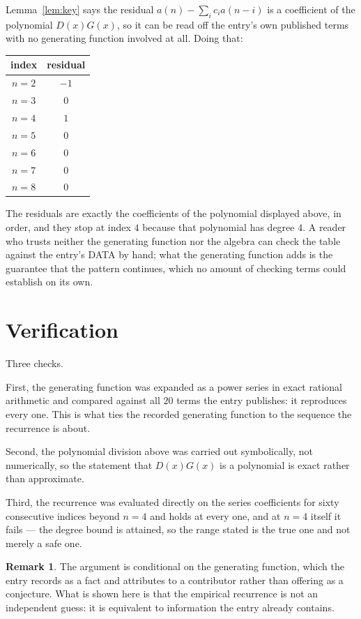 \documentclass[11pt,a4paper]{article}
\theoremstyle{plain}
\theoremstyle{definition}
\newtheorem{remark}[theorem]{Remark}
\begin{document}
Lemma~\ref{lem:key} says the residual $a(n)-\sum_ic_ia(n-i)$ is a coefficient of the
polynomial $D(x)G(x)$, so it can be read off the entry's own published terms with no
generating function involved at all. Doing that:
\begin{center}
\begin{tabular}{cc}
index & residual \\ \hline
$n=2$ & $-1$ \\
$n=3$ & $0$ \\
$n=4$ & $1$ \\
$n=5$ & $0$ \\
$n=6$ & $0$ \\
$n=7$ & $0$ \\
$n=8$ & $0$
\end{tabular}
\end{center}
The residuals are exactly the coefficients of the polynomial displayed above, in order, and
they stop at index $4$ because that polynomial has degree $4$. A reader who trusts
neither the generating function nor the algebra can check the table against the entry's DATA
by hand; what the generating function adds is the guarantee that the pattern continues, which
no amount of checking terms could establish on its own.

\section{Verification}

Three checks.

First, the generating function was expanded as a power series in exact rational arithmetic and
compared against all $20$ terms the entry publishes: it reproduces every one. This is
what ties the recorded generating function to the sequence the recurrence is about.

Second, the polynomial division above was carried out symbolically, not numerically, so the
statement that $D(x)G(x)$ is a polynomial is exact rather than approximate.

Third, the recurrence was evaluated directly on the series coefficients for sixty consecutive
indices beyond $n=4$ and holds at every one, and at $n=4$ itself it fails --- the
degree bound is attained, so the range stated is the true one and not merely a safe one.

\begin{remark}
The argument is conditional on the generating function, which the entry records as a fact and
attributes to a contributor rather than offering as a conjecture. What is shown here is that
the empirical recurrence is not an independent guess: it is equivalent to information the
entry already contains.
\end{remark}
\end{document}
